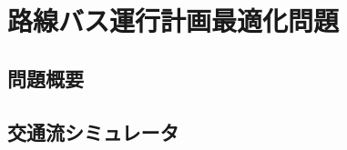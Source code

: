 \documentclass[main]{subfiles}
\begin{document}
\chapter{路線バス運行計画最適化問題}
\section{問題概要}
\section{交通流シミュレータ}
\end{document}
